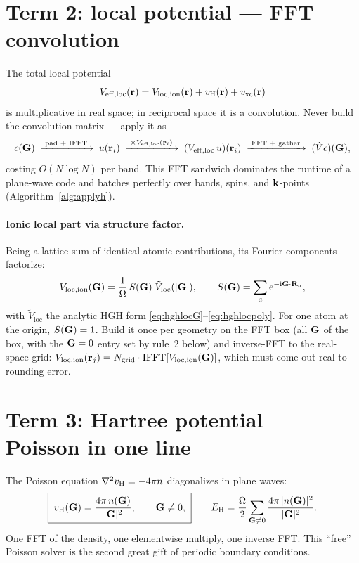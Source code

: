 \section{Term 2: local potential --- FFT convolution}

The total local potential
\begin{equation}
V_{\mathrm{eff,loc}}(\mathbf{r}) = V_{\mathrm{loc,ion}}(\mathbf{r}) + v_{\mathrm{H}}(\mathbf{r}) + v_{\mathrm{xc}}(\mathbf{r})
\end{equation}
is multiplicative in real space; in reciprocal space it is a convolution.
Never build the convolution matrix --- apply it as
\begin{equation}
c(\mathbf{G}) \;\xrightarrow{\;\text{pad + IFFT}\;}\; u(\mathbf{r}_i)
\;\xrightarrow{\;\times V_{\mathrm{eff,loc}}(\mathbf{r}_i)\;}\;
(V_{\mathrm{eff,loc}}\,u)(\mathbf{r}_i)
\;\xrightarrow{\;\text{FFT + gather}\;}\; (\hat V c)(\mathbf{G}),
\end{equation}
costing $O(N \log N)$ per band. This FFT sandwich dominates the runtime of a plane-wave code and batches
perfectly over bands, spins, and $\mathbf{k}$-points
(Algorithm~\ref{alg:applyh}).

\paragraph{Ionic local part via structure factor.} Being a lattice sum of
identical atomic contributions, its Fourier components factorize:
\begin{equation}
V_{\mathrm{loc,ion}}(\mathbf{G}) = \frac{1}{\Omega}\, S(\mathbf{G})\;
\tilde V_{\mathrm{loc}}(|\mathbf{G}|),
\qquad
S(\mathbf{G}) = \sum_{a} \mathrm{e}^{-\mathrm{i} \mathbf{G} \cdot \mathbf{R}_a},
\label{eq:structfact}
\end{equation}
with $\tilde V_{\mathrm{loc}}$ the analytic HGH form
\eqref{eq:hghlocG}--\eqref{eq:hghlocpoly}. For
one atom at the origin, $S(\mathbf{G}) = 1$. Build it once per geometry on the FFT
box (all $\mathbf{G}$ of the box, with the $\mathbf{G}=0$ entry set by rule~2 below) and
inverse-FFT to the real-space grid: $V_{\mathrm{loc,ion}}(\mathbf{r}_j) =
N_{\mathrm{grid}}\cdot\mathrm{IFFT}[V_{\mathrm{loc,ion}}(\mathbf{G})]$, which must
come out real to rounding error.

\section{Term 3: Hartree potential --- Poisson in one line}

The Poisson equation $\nabla^2 v_{\mathrm{H}} = -4\pi n$ diagonalizes in plane waves:
\begin{equation}
\boxed{\;
v_{\mathrm{H}}(\mathbf{G}) = \frac{4\pi\, n(\mathbf{G})}{|\mathbf{G}|^2}, \qquad \mathbf{G} \ne 0,
\;}
\qquad
E_{\mathrm H} = \frac{\Omega}{2} \sum_{\mathbf{G} \ne 0}
\frac{4\pi\, |n(\mathbf{G})|^2}{|\mathbf{G}|^2}.
\label{eq:hartreeG}
\end{equation}
One FFT of the density, one elementwise multiply, one inverse FFT. This
``free'' Poisson solver is the second great gift of periodic boundary
conditions.

